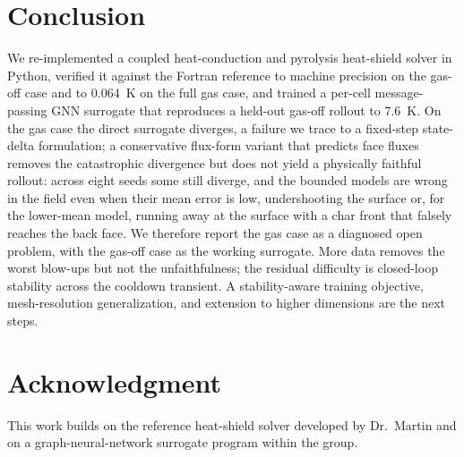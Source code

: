 \documentclass[conference]{IEEEtran}
\begin{document}
\section{Conclusion}
We re-implemented a coupled heat-conduction and pyrolysis heat-shield solver in
Python, verified it against the Fortran reference to machine precision on the
gas-off case and to 0.064~K on the full gas case, and trained a per-cell
message-passing GNN surrogate that reproduces a held-out gas-off rollout to 7.6~K.
On the gas case the direct surrogate diverges, a failure we trace to a fixed-step
state-delta formulation; a conservative flux-form variant that predicts face fluxes
removes the catastrophic divergence but does not yield a physically faithful
rollout: across eight seeds some still diverge, and the bounded models are wrong in
the field even when their mean error is low, undershooting the surface or, for the
lower-mean model, running away at the surface with a char front that falsely
reaches the back face. We therefore report the gas case as a diagnosed open
problem, with the gas-off case as the working surrogate. More data removes the
worst blow-ups but not the unfaithfulness; the residual difficulty is closed-loop
stability across the cooldown transient. A stability-aware training objective,
mesh-resolution generalization, and extension to higher dimensions are the next
steps.

\section*{Acknowledgment}
This work builds on the reference heat-shield solver developed by Dr.\ Martin and
on a graph-neural-network surrogate program within the group.



\end{document}
